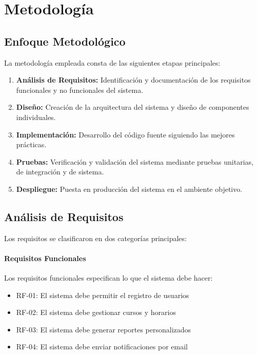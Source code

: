 \documentclass{pt-report}
\begin{document}
\section{Metodología}

\subsection{Enfoque Metodológico}

La metodología empleada consta de las siguientes etapas principales:

\begin{enumerate}
    \item \textbf{Análisis de Requisitos:} Identificación y documentación de los requisitos funcionales y no funcionales del sistema.
    \item \textbf{Diseño:} Creación de la arquitectura del sistema y diseño de componentes individuales.
    \item \textbf{Implementación:} Desarrollo del código fuente siguiendo las mejores prácticas.
    \item \textbf{Pruebas:} Verificación y validación del sistema mediante pruebas unitarias, de integración y de sistema.
    \item \textbf{Despliegue:} Puesta en producción del sistema en el ambiente objetivo.
\end{enumerate}

\subsection{Análisis de Requisitos}

Los requisitos se clasificaron en dos categorías principales:

\paragraph{Requisitos Funcionales}

Los requisitos funcionales especifican lo que el sistema debe hacer:

\begin{itemize}
    \item RF-01: El sistema debe permitir el registro de usuarios
    \item RF-02: El sistema debe gestionar cursos y horarios
    \item RF-03: El sistema debe generar reportes personalizados
    \item RF-04: El sistema debe enviar notificaciones por email
\end{itemize}
\end{document}
